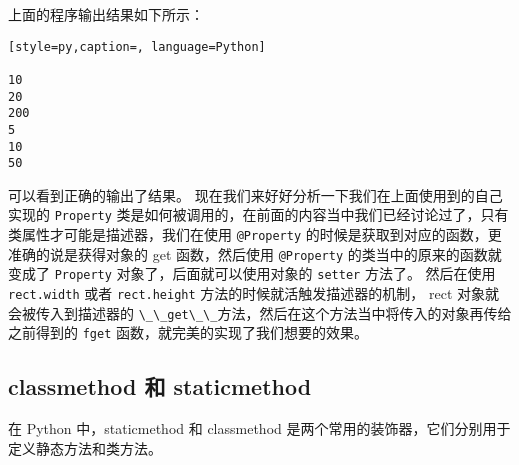 上面的程序输出结果如下所示：
\begin{lstlisting}[style=py,caption=, language=Python]

10
20
200
5
10
50
\end{lstlisting}
可以看到正确的输出了结果。
现在我们来好好分析一下我们在上面使用到的自己实现的 \verb|Property| 类是如何被调用的，在前面的内容当中我们已经讨论过了，只有类属性才可能是描述器，我们在使用 \verb|@Property| 的时候是获取到对应的函数，更准确的说是获得对象的 get 函数，然后使用 \verb|@Property| 的类当中的原来的函数就变成了 \verb|Property| 对象了，后面就可以使用对象的 \verb|setter| 方法了。
然后在使用 \verb|rect.width| 或者 \verb|rect.height| 方法的时候就活触发描述器的机制， rect 对象就会被传入到描述器的 \verb|\_\_get\_\_|方法，然后在这个方法当中将传入的对象再传给之前得到的 \verb|fget| 函数，就完美的实现了我们想要的效果。
\subsection{classmethod 和 staticmethod}
在 Python 中，staticmethod 和 classmethod 是两个常用的装饰器，它们分别用于定义静态方法和类方法。
